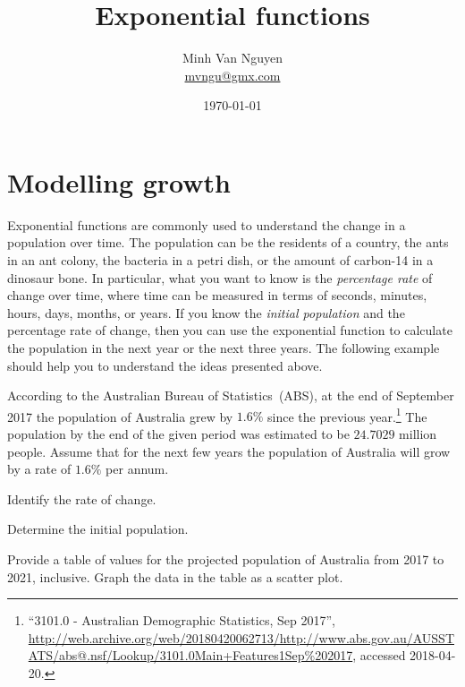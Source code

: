 \documentclass[a4paper,oneside,12pt]{article}
\begin{document}
\title{\Large\bf Exponential functions}
\author{%
  Minh Van Nguyen \\
  \url{mvngu@gmx.com}
}
\date{\today}
\maketitle



\section{Modelling growth}

Exponential functions are commonly used to understand the change in a
population over time.  The population can be the residents of a
country, the ants in an ant colony, the bacteria in a petri dish, or
the amount of carbon-14 in a dinosaur bone.  In particular, what you
want to know is the \emph{percentage rate} of change over time, where
time can be measured in terms of seconds, minutes, hours, days,
months, or years.  If you know the \emph{initial population} and the
percentage rate of change, then you can use the exponential function
to calculate the population in the next year or the next three years.
The following example should help you to understand the ideas
presented above.

\begin{example}
\label{eg:Australian_population_2017}
According to the Australian Bureau of Statistics~(ABS), at the end of
September 2017 the population of Australia grew by $1.6\%$ since the
previous year.\footnote{
  ``3101.0 - Australian Demographic Statistics, Sep 2017'',
  \url{http://web.archive.org/web/20180420062713/http://www.abs.gov.au/AUSSTATS/abs@.nsf/Lookup/3101.0Main+Features1Sep\%202017},
  accessed 2018-04-20.
}
The population by the end of the given period was estimated to be
$24.7029$ million people.  Assume that for the next few years the
population of Australia will grow by a rate of $1.6\%$ per annum.
\begin{packedenum}
\item\label{subeg:Australian_population_2017_growth_rate}
  Identify the rate of change.

\item\label{subeg:Australian_population_2017_initial_population}
  Determine the initial population.

\item\label{subeg:Australian_population_2017_table_graph}
  Provide a table of values for the projected population of Australia
  from 2017 to 2021, inclusive.  Graph the data in the table as a
  scatter plot.
\end{packedenum}
\end{example}
\end{document}
